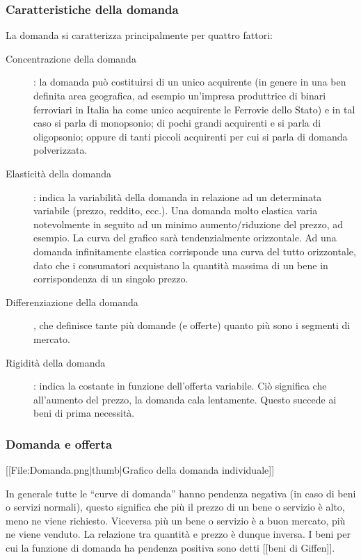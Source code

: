 \subsubsection{Caratteristiche della domanda}


La domanda si caratterizza principalmente per quattro fattori:
\begin{description}
 \item [Concentrazione della domanda]: la domanda può costituirsi di un unico 
acquirente (in genere in una ben definita area geografica, ad esempio 
un'impresa produttrice di binari ferroviari in Italia ha come unico acquirente 
le Ferrovie dello Stato) e in tal caso si parla di monopsonio; di pochi 
grandi acquirenti e si parla di oligopsonio; oppure di tanti piccoli 
acquirenti per cui si parla di domanda polverizzata.
 \item [Elasticità della domanda]: indica la variabilità della domanda in 
relazione ad un determinata variabile (prezzo, reddito, ecc.). Una domanda 
molto elastica varia notevolmente in seguito ad un minimo aumento/riduzione del 
prezzo, ad esempio. La curva del grafico sarà tendenzialmente orizzontale. Ad 
una domanda infinitamente elastica corrisponde una curva del tutto orizzontale, 
dato che i consumatori acquistano la quantità massima di un 
bene in corrispondenza di un singolo prezzo.
 \item [Differenziazione della domanda], che definisce tante più domande (e 
offerte) quanto più sono i segmenti di mercato.
 \item [Rigidità della domanda]: indica la costante in funzione dell'offerta 
variabile. Ciò significa che all'aumento del prezzo, la domanda cala 
lentamente. Questo succede ai beni di prima necessità.
\end{description}

\subsubsection{Domanda e offerta}

[[File:Domanda.png|thumb|Grafico della domanda individuale]]

In generale tutte le ``curve di domanda'' hanno pendenza negativa (in caso di 
beni o servizi normali), questo significa che più il prezzo di un bene o 
servizio è alto, meno ne viene richiesto. Viceversa più un bene o servizio è a 
buon mercato, più ne viene venduto. La relazione tra quantità e prezzo è dunque 
inversa. I beni per cui la funzione di domanda ha pendenza positiva sono detti 
[[beni di Giffen]].

